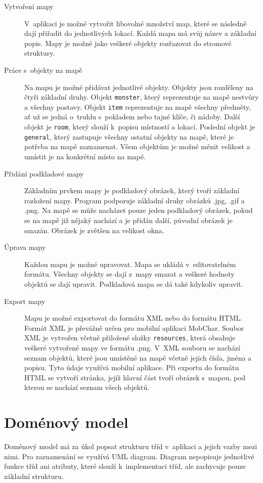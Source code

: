 \documentclass[thesis=B,czech]{resources/FITthesis}[2012/06/26]
\begin{document}
	\begin{description}
		\item[Vytvoření mapy]
V~aplikaci je možné vytvořit libovolné množství map, které se následně dají přiřadit do jednotlivých lokací. Každá mapa má svůj název a základní popis. Mapy je možné jako veškeré objekty rozřazovat do stromové struktury. 

		\item[Práce s~objekty na mapě]
Na mapu je možné přidávat jednotlivé objekty. Objekty jsou rozděleny na čtyři základní druhy. Objekt \texttt{monster}, který reprezentuje na mapě nestvůry a všechny postavy. Objekt \texttt{item} reprezentuje na mapě všechny předměty, ať už se jedná o~truhlu s~pokladem nebo tajné klíče, či nádoby. Další objekt je \texttt{room}, který slouží k~popisu místností a lokací. Poslední objekt je \texttt{general}, který zastupuje všechny ostatní objekty na mapě, které je potřeba na mapě zaznamenat. Všem objektům je možné měnit velikost a umístit je na konkrétní místo na mapě.

		\item[Přidání podkladové mapy]
Základním prvkem mapy je podkladový obrázek, který tvoří základní rozložení mapy. Program podporuje základní druhy obrázků .jpg, .gif a .png. Na mapě se může nacházet pouze jeden podkladový obrázek, pokud se na mapě již nějaký nachází a je přidán další, původní obrázek je smazán. Obrázek je zvětšen na velikost okna.

		\item[Úprava mapy]
Každou mapu je možné upravovat. Mapa se ukládá v~editovatelném formátu. Všechny objekty se dají z~mapy smazat a veškeré hodnoty objektů se dají upravit. Podkladová mapa se dá také kdykoliv upravit.  
		
		\item[Export mapy]
Mapu je možné exportovat do formátu XML nebo do formátu HTML. Formát XML je převážně určen pro mobilní aplikaci MobChar. Soubor XML je vytvořen včetně přiložené složky \texttt{resources}, která obsahuje veškeré vytvořené mapy ve formátu .png. V~XML souboru se nachází seznam objektů, které jsou umístěné na mapě včetně jejich čísla, jména a popisu. Tyto údaje využívá mobilní aplikace. Při exportu do formátu HTML se vytvoří stránka, jejíž hlavní část tvoří obrázek s~mapou, pod kterou se nachází seznam všech objektů.

	\end{description}
	\section{Doménový model}
Doménový model má za úkol popsat strukturu tříd v~aplikaci a jejich vazby mezi nimi. Pro zaznamenání se využívá UML diagram. Diagram nepopisuje jednotlivé funkce tříd ani atributy, které slouží k~implementaci tříd, ale zachycuje pouze základní strukturu.
\end{document}
